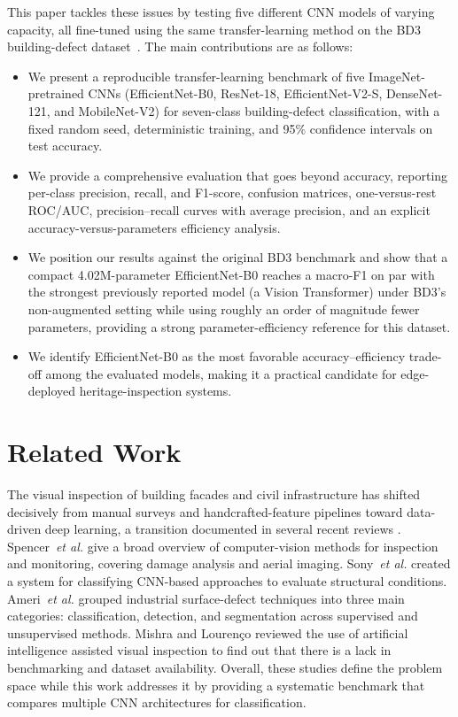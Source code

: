 \documentclass[ASNA, twocolumn]{USG}
\begin{document}
This paper tackles these issues by testing five different CNN models of varying capacity, all fine-tuned using the same transfer-learning method on the BD3 building-defect dataset~\cite{ref40}. The main contributions are as follows:
\begin{itemize}
\item We present a reproducible transfer-learning benchmark of five ImageNet-pretrained CNNs (EfficientNet-B0, ResNet-18, EfficientNet-V2-S, DenseNet-121, and MobileNet-V2) for seven-class building-defect classification, with a fixed random seed, deterministic training, and 95\% confidence intervals on test accuracy.
\item We provide a comprehensive evaluation that goes beyond accuracy, reporting per-class precision, recall, and F1-score, confusion matrices, one-versus-rest ROC/AUC, precision--recall curves with average precision, and an explicit accuracy-versus-parameters efficiency analysis.
\item We position our results against the original BD3 benchmark and show that a compact 4.02M-parameter EfficientNet-B0 reaches a macro-F1 on par with the strongest previously reported model (a Vision Transformer) under BD3's non-augmented setting while using roughly an order of magnitude fewer parameters, providing a strong parameter-efficiency reference for this dataset.
\item We identify EfficientNet-B0 as the most favorable accuracy--efficiency trade-off among the evaluated models, making it a practical candidate for edge-deployed heritage-inspection systems.
\end{itemize}

\section{Related Work}

The visual inspection of building facades and civil infrastructure has shifted decisively from manual surveys and handcrafted-feature pipelines toward data-driven deep learning, a transition documented in several recent reviews \cite{ref1,ref2,ref3,ref4}. Spencer~\textit{et al.}\cite{ref2} give a broad overview of computer-vision methods for inspection and monitoring, covering damage analysis and aerial imaging. Sony~\textit{et al.}\cite{ref3} created a system for classifying CNN-based approaches to evaluate structural conditions. Ameri~\textit{et al.} \cite{ref4}grouped industrial surface-defect techniques into three main categories: classification, detection, and segmentation across supervised and unsupervised methods. Mishra and Lourenço\cite{ref1} reviewed the use of artificial intelligence assisted visual inspection to find out that there is a lack in benchmarking and dataset availability. Overall, these studies define the problem space while this work addresses it by providing a systematic benchmark that compares multiple CNN architectures for classification.
\end{document}
